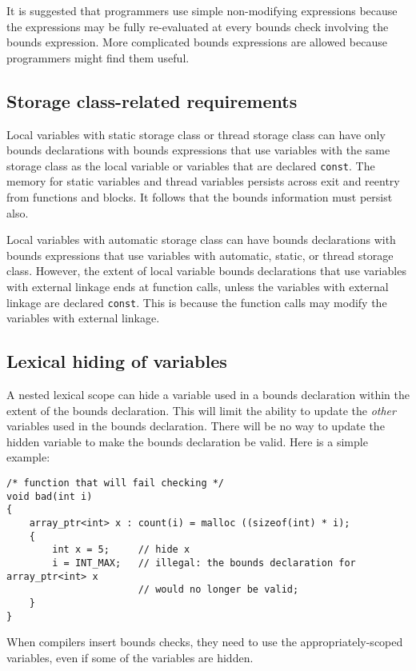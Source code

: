 It is suggested that programmers use simple non-modifying expressions because
the expressions may be fully re-evaluated at every bounds check involving the
bounds expression. More complicated bounds expressions are allowed
because programmers might find them useful.

\subsection{Storage class-related requirements}

Local variables with static storage class or thread storage class can
have only bounds declarations with bounds expressions that use variables
with the same storage class as the local variable or variables that are declared
\texttt{const}. The memory for static variables and thread variables
persists across exit and reentry from functions and blocks. It follows
that the bounds information must persist also.

Local variables with automatic storage class can have bounds
declarations with bounds expressions that use variables with automatic,
static, or thread storage class. However, the extent of local variable
bounds declarations that use variables with external linkage ends at
function calls, unless the variables with external linkage are declared
\texttt{const}. This is because the function calls may modify the
variables with external linkage.

\subsection{Lexical hiding of variables}

A nested lexical scope can hide a variable used in a bounds declaration
within the extent of the bounds declaration. This will limit the ability
to update the {\it other} variables used in the bounds declaration.  There will be
no way to update the hidden variable to make the bounds declaration be valid.
Here is a simple example:
\begin{lstlisting}
/* function that will fail checking */
void bad(int i)
{
    array_ptr<int> x : count(i) = malloc ((sizeof(int) * i);
    {
        int x = 5;     // hide x
        i = INT_MAX;   // illegal: the bounds declaration for array_ptr<int> x
                       // would no longer be valid;
    }
}
\end{lstlisting}
When compilers insert bounds checks, they need to use the appropriately-scoped
variables, even if some of the variables are hidden.

